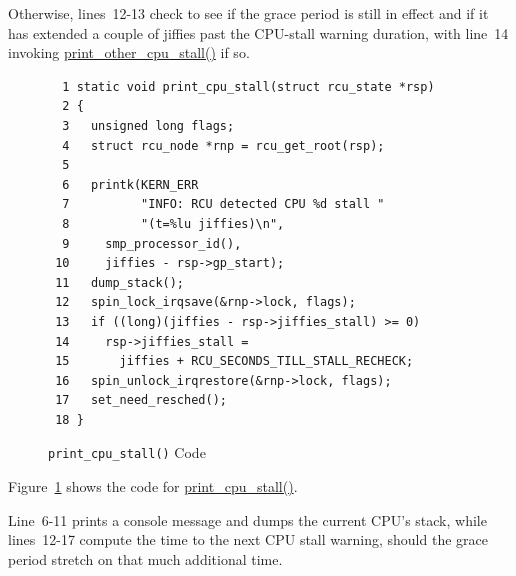 Otherwise, lines~12-13 check to see if the grace period is still in effect
and if it has extended a couple of jiffies past the CPU-stall warning
duration, with line~14 invoking \url{print_other_cpu_stall()} if so.

 \QuickQuizEnd

\begin{figure}[tbp]
{ \scriptsize
\begin{verbatim}
  1 static void print_cpu_stall(struct rcu_state *rsp)
  2 {
  3   unsigned long flags;
  4   struct rcu_node *rnp = rcu_get_root(rsp);
  5 
  6   printk(KERN_ERR
  7          "INFO: RCU detected CPU %d stall "
  8          "(t=%lu jiffies)\n",
  9     smp_processor_id(),
 10     jiffies - rsp->gp_start);
 11   dump_stack();
 12   spin_lock_irqsave(&rnp->lock, flags);
 13   if ((long)(jiffies - rsp->jiffies_stall) >= 0)
 14     rsp->jiffies_stall =
 15       jiffies + RCU_SECONDS_TILL_STALL_RECHECK;
 16   spin_unlock_irqrestore(&rnp->lock, flags);
 17   set_need_resched();
 18 }
\end{verbatim}
}
\caption{{\tt print\_cpu\_stall()} Code}
\label{fig:app:rcuimpl:rcutreewt:Code for print-cpu-stall}
\end{figure}

Figure~\ref{fig:app:rcuimpl:rcutreewt:Code for print-cpu-stall}
shows the code for \url{print_cpu_stall()}.

Line~6-11 prints a console message and dumps the current CPU's stack,
while lines~12-17 compute the time to the next CPU stall warning, should
the grace period stretch on that much additional time.

 \QuickQuizEnd

